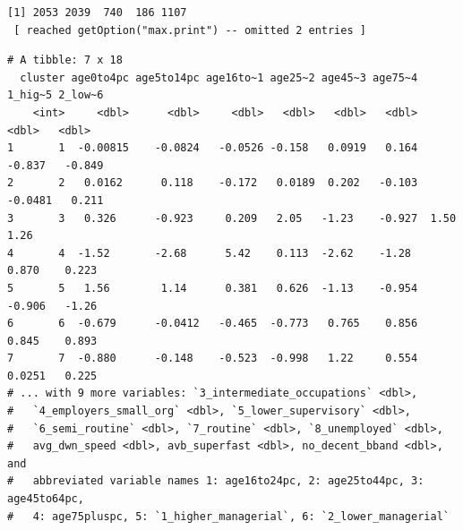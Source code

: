 \documentclass[
  letterpaper,
  DIV=11,
  numbers=noendperiod]{scrreprt}
\newenvironment{Shaded}{\begin{snugshade}}{\end{snugshade}}
\newcommand{\AttributeTok}[1]{\textcolor[rgb]{0.40,0.45,0.13}{#1}}
\newcommand{\CommentTok}[1]{\textcolor[rgb]{0.37,0.37,0.37}{#1}}
\newcommand{\DecValTok}[1]{\textcolor[rgb]{0.68,0.00,0.00}{#1}}
\newcommand{\FunctionTok}[1]{\textcolor[rgb]{0.28,0.35,0.67}{#1}}
\newcommand{\NormalTok}[1]{\textcolor[rgb]{0.00,0.23,0.31}{#1}}
\newcommand{\OtherTok}[1]{\textcolor[rgb]{0.00,0.23,0.31}{#1}}
\newcommand{\SpecialCharTok}[1]{\textcolor[rgb]{0.37,0.37,0.37}{#1}}
\newcommand{\StringTok}[1]{\textcolor[rgb]{0.13,0.47,0.30}{#1}}
\begin{document}
\begin{verbatim}
[1] 2053 2039  740  186 1107
 [ reached getOption("max.print") -- omitted 2 entries ]
\end{verbatim}

\begin{Shaded}
\end{Shaded}

\begin{verbatim}
# A tibble: 7 x 18
  cluster age0to4pc age5to14pc age16to~1 age25~2 age45~3 age75~4 1_hig~5 2_low~6
    <int>     <dbl>      <dbl>     <dbl>   <dbl>   <dbl>   <dbl>   <dbl>   <dbl>
1       1  -0.00815    -0.0824   -0.0526 -0.158   0.0919   0.164 -0.837   -0.849
2       2   0.0162      0.118    -0.172   0.0189  0.202   -0.103 -0.0481   0.211
3       3   0.326      -0.923     0.209   2.05   -1.23    -0.927  1.50     1.26 
4       4  -1.52       -2.68      5.42    0.113  -2.62    -1.28   0.870    0.223
5       5   1.56        1.14      0.381   0.626  -1.13    -0.954 -0.906   -1.26 
6       6  -0.679      -0.0412   -0.465  -0.773   0.765    0.856  0.845    0.893
7       7  -0.880      -0.148    -0.523  -0.998   1.22     0.554  0.0251   0.225
# ... with 9 more variables: `3_intermediate_occupations` <dbl>,
#   `4_employers_small_org` <dbl>, `5_lower_supervisory` <dbl>,
#   `6_semi_routine` <dbl>, `7_routine` <dbl>, `8_unemployed` <dbl>,
#   avg_dwn_speed <dbl>, avb_superfast <dbl>, no_decent_bband <dbl>, and
#   abbreviated variable names 1: age16to24pc, 2: age25to44pc, 3: age45to64pc,
#   4: age75pluspc, 5: `1_higher_managerial`, 6: `2_lower_managerial`
\end{verbatim}
\end{document}
